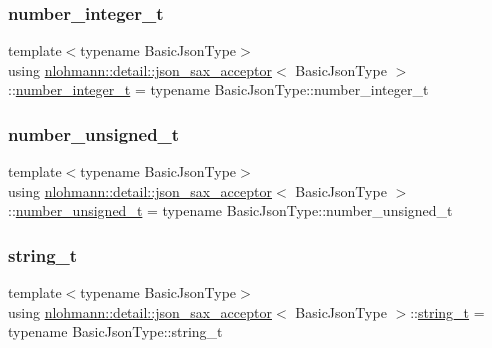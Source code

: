 \subsubsection{\texorpdfstring{number\_integer\_t}{number\_integer\_t}}
{\footnotesize\ttfamily template$<$typename Basic\+Json\+Type$>$ \\
using \mbox{\hyperlink{classnlohmann_1_1detail_1_1json__sax__acceptor}{nlohmann\+::detail\+::json\+\_\+sax\+\_\+acceptor}}$<$ Basic\+Json\+Type $>$\+::\mbox{\hyperlink{classnlohmann_1_1detail_1_1json__sax__acceptor_a41876b17c0e8bdb55580eaf5e4e2ded8}{number\+\_\+integer\+\_\+t}} =  typename Basic\+Json\+Type\+::number\+\_\+integer\+\_\+t}

\mbox{\label{classnlohmann_1_1detail_1_1json__sax__acceptor_ae07454608ea6f3cfb765f95e3c850043}} 
\subsubsection{\texorpdfstring{number\_unsigned\_t}{number\_unsigned\_t}}
{\footnotesize\ttfamily template$<$typename Basic\+Json\+Type$>$ \\
using \mbox{\hyperlink{classnlohmann_1_1detail_1_1json__sax__acceptor}{nlohmann\+::detail\+::json\+\_\+sax\+\_\+acceptor}}$<$ Basic\+Json\+Type $>$\+::\mbox{\hyperlink{classnlohmann_1_1detail_1_1json__sax__acceptor_ae07454608ea6f3cfb765f95e3c850043}{number\+\_\+unsigned\+\_\+t}} =  typename Basic\+Json\+Type\+::number\+\_\+unsigned\+\_\+t}

\mbox{\label{classnlohmann_1_1detail_1_1json__sax__acceptor_a3a8078bbf865ec355106f6048241609a}} 
\subsubsection{\texorpdfstring{string\_t}{string\_t}}
{\footnotesize\ttfamily template$<$typename Basic\+Json\+Type$>$ \\
using \mbox{\hyperlink{classnlohmann_1_1detail_1_1json__sax__acceptor}{nlohmann\+::detail\+::json\+\_\+sax\+\_\+acceptor}}$<$ Basic\+Json\+Type $>$\+::\mbox{\hyperlink{classnlohmann_1_1detail_1_1json__sax__acceptor_a3a8078bbf865ec355106f6048241609a}{string\+\_\+t}} =  typename Basic\+Json\+Type\+::string\+\_\+t}



